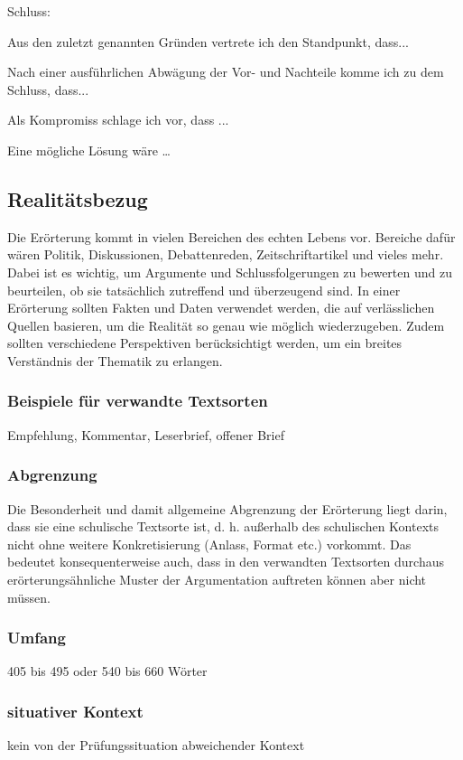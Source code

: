 Schluss: 
\begin{compactitem}
    \item Aus den zuletzt genannten Gründen vertrete ich den Standpunkt, dass... 
    \item Nach einer ausführlichen Abwägung der Vor- und Nachteile komme ich zu dem Schluss, dass... 
    \item Als Kompromiss schlage ich vor, dass ...  
    \item Eine mögliche Lösung wäre … 
\end{compactitem}

\subsection{Realitätsbezug}

Die Erörterung kommt in vielen Bereichen des echten Lebens vor.  Bereiche dafür wären Politik, Diskussionen, Debattenreden, Zeitschriftartikel und vieles mehr. Dabei ist es wichtig, um Argumente und Schlussfolgerungen zu bewerten und zu beurteilen, ob sie tatsächlich zutreffend und überzeugend sind. In einer Erörterung sollten Fakten und Daten verwendet werden, die auf verlässlichen Quellen basieren, um die Realität so genau wie möglich wiederzugeben. Zudem sollten verschiedene Perspektiven berücksichtigt werden, um ein breites Verständnis der Thematik zu erlangen. 


\subsubsection{Beispiele für verwandte Textsorten}
Empfehlung, Kommentar, Leserbrief, offener Brief

\subsubsection{Abgrenzung}
Die Besonderheit und damit allgemeine Abgrenzung der Erörterung
liegt darin, dass sie eine schulische Textsorte ist, d. h. außerhalb des
schulischen Kontexts nicht ohne weitere Konkretisierung (Anlass, Format etc.) vorkommt. Das bedeutet konsequenterweise auch, dass in
den verwandten Textsorten durchaus erörterungsähnliche Muster der
Argumentation auftreten können aber nicht müssen.

\subsubsection{Umfang}
405 bis 495 oder 540 bis 660 Wörter

\subsubsection{situativer Kontext}
kein von der Prüfungssituation abweichender Kontext
